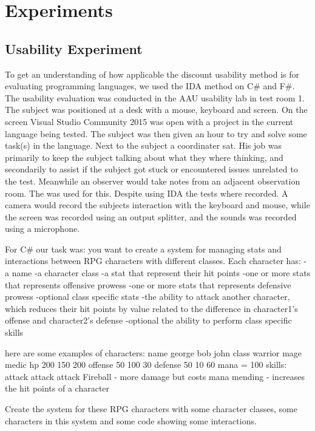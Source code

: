 \chapter{Experiments}
\section{Usability Experiment}
To get an understanding of how applicable the discount usability method is for evaluating programming languages, we used the IDA method on C\# and F\#.
The usability evaluation was conducted in the AAU usability lab  in test room 1.
The subject was positioned at a desk with a mouse, keyboard and screen.
On the screen Visual Studio Community 2015 was open with a project in the current language being tested.
The subject was then given an hour to try and solve some task(s) in the language.
Next to the subject a coordinater sat.
His job was primarily to keep the subject talking about what they where thinking, and secondarily to assist if the subject got stuck or encountered issues unrelated to the test.
Meanwhile an observer would take notes from an adjacent observation room.
The  was used for this.
Despite using IDA the tests where recorded.
A camera would record the subjects interaction with the keyboard and mouse, while the screen was recorded using an output splitter, and the sounds was recorded using a microphone.

For C\# our task was:
you want to create a system for managing stats and interactions between RPG characters with different classes.
Each character has:
-a name
-a character class
-a stat that represent their hit points
-one or more stats that represents offensive prowess
-one or more stats that represents defensive prowess
-optional class specific stats
-the ability to attack another character, which reduces their hit points by value related to the difference in character1's offense and character2's defense
-optional the ability to perform class specific skills

here are some examples of characters:
name 	george		bob					john
class	warrior		mage					medic
hp	200		150					200
offense	50		100					30
defense	50		10					60
			mana = 100
skills:	attack		attack					attack
					Fireball - more damage but costs mana	mending - increases the hit points of a character

Create the system for these RPG characters with some character classes, some characters in this system and some code showing some interactions.

